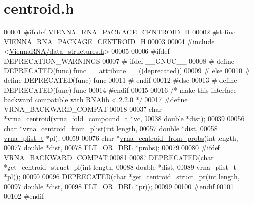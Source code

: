 \hypertarget{centroid_8h_source}{}\section{centroid.\+h}
\label{centroid_8h_source}

\begin{DoxyCode}
00001 \textcolor{preprocessor}{#ifndef VIENNA\_RNA\_PACKAGE\_CENTROID\_H}
00002 \textcolor{preprocessor}{#define VIENNA\_RNA\_PACKAGE\_CENTROID\_H}
00003 
00004 \textcolor{preprocessor}{#include <\hyperlink{data__structures_8h}{ViennaRNA/data\_structures.h}>}
00005 
00006 \textcolor{preprocessor}{#ifdef DEPRECATION\_WARNINGS}
00007 \textcolor{preprocessor}{# ifdef \_\_GNUC\_\_}
00008 \textcolor{preprocessor}{#  define DEPRECATED(func) func \_\_attribute\_\_ ((deprecated))}
00009 \textcolor{preprocessor}{# else}
00010 \textcolor{preprocessor}{#  define DEPRECATED(func) func}
00011 \textcolor{preprocessor}{# endif}
00012 \textcolor{preprocessor}{#else}
00013 \textcolor{preprocessor}{# define DEPRECATED(func) func}
00014 \textcolor{preprocessor}{#endif}
00015 
00016 \textcolor{comment}{/* make this interface backward compatible with RNAlib < 2.2.0 */}
00017 \textcolor{preprocessor}{#define VRNA\_BACKWARD\_COMPAT}
00018 
00037 \textcolor{keywordtype}{char} *\hyperlink{group__centroid__fold_ga0e64bb67e51963dc71cbd4d30b80a018}{vrna\_centroid}(\hyperlink{group__fold__compound_structvrna__fc__s}{vrna\_fold\_compound\_t} *vc,
00038                     \textcolor{keywordtype}{double} *dist);
00039 
00056 \textcolor{keywordtype}{char}  *\hyperlink{group__centroid__fold_ga70525a53b879c1427f9ea546c96fa1c5}{vrna\_centroid\_from\_plist}(\textcolor{keywordtype}{int} length,
00057                                 \textcolor{keywordtype}{double} *dist,
00058                                 \hyperlink{group__data__structures_structvrna__plist__s}{vrna\_plist\_t} *pl);
00059 
00076 \textcolor{keywordtype}{char}  *\hyperlink{group__centroid__fold_ga98193ede06778a9ea966cc8fc43d0804}{vrna\_centroid\_from\_probs}(\textcolor{keywordtype}{int} length,
00077                                 \textcolor{keywordtype}{double} *dist,
00078                                 \hyperlink{group__data__structures_ga31125aeace516926bf7f251f759b6126}{FLT\_OR\_DBL} *probs);
00079 
00080 \textcolor{preprocessor}{#ifdef VRNA\_BACKWARD\_COMPAT}
00081 
00087 DEPRECATED(\textcolor{keywordtype}{char}  *\hyperlink{centroid_8h_a8f387bf1583fb5eaf5f4ffd78493e43e}{get\_centroid\_struct\_pl}(\textcolor{keywordtype}{int} length,
00088                               \textcolor{keywordtype}{double} *dist,
00089                               \hyperlink{group__data__structures_structvrna__plist__s}{vrna\_plist\_t} *pl));
00090 
00096 DEPRECATED(\textcolor{keywordtype}{char}  *\hyperlink{centroid_8h_ac92486ce514677256f4a832dc518759c}{get\_centroid\_struct\_pr}(\textcolor{keywordtype}{int} length,
00097                               \textcolor{keywordtype}{double} *dist,
00098                               \hyperlink{group__data__structures_ga31125aeace516926bf7f251f759b6126}{FLT\_OR\_DBL} *\hyperlink{fold__vars_8h_ac98ec419070aee6831b44e5c700f090f}{pr}));
00099 
00100 \textcolor{preprocessor}{#endif}
00101 
00102 \textcolor{preprocessor}{#endif}
\end{DoxyCode}
